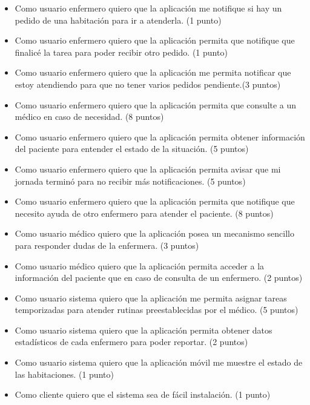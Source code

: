 \documentclass[
11pt, %
]{charter}
\begin{document}
\begin{itemize}
\item Como usuario enfermero quiero que la aplicación me notifique si hay un pedido de una habitación para ir a atenderla. (1 punto)

\item Como usuario enfermero quiero que la aplicación permita que notifique que finalicé la tarea para poder recibir otro pedido. (1 punto)

\item Como usuario enfermero quiero que la aplicación me permita notificar que estoy atendiendo para que no tener varios pedidos pendiente.(3 puntos)

\item Como usuario enfermero quiero que la aplicación permita que consulte a un médico en caso de necesidad. (8 puntos)

\item Como usuario enfermero quiero que la aplicación permita obtener información del paciente para entender el estado de la situación. (5 puntos)

\item Como usuario enfermero quiero que la aplicación permita avisar que mi jornada terminó para no recibir más notificaciones. (5 puntos)

\item Como usuario enfermero quiero que la aplicación permita que notifique que necesito ayuda de otro enfermero para atender el paciente.
(8 puntos)

\item Como usuario médico quiero que la aplicación posea un mecanismo sencillo para responder dudas de la enfermera. (3 puntos)

\item Como usuario médico quiero que la aplicación permita acceder a la información del paciente que en caso de consulta de un enfermero. (2 puntos)

\item Como usuario sistema quiero que la aplicación me permita asignar tareas temporizadas para atender rutinas preestablecidas por el médico.
(5 puntos)

\item Como usuario sistema quiero que la aplicación permita obtener datos estadísticos de cada enfermero para poder reportar. (2 puntos)

\item Como usuario sistema quiero que la aplicación móvil me muestre el estado de las habitaciones. (1 punto)

\item Como cliente quiero que el sistema sea de fácil instalación. (1 punto)

\end{itemize}
\end{document}

